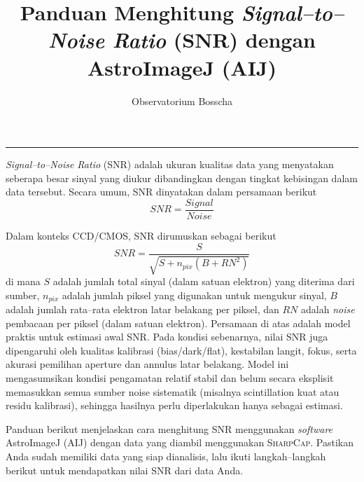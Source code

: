 \documentclass[12pt,a4paper]{article}
\title{\textbf{Panduan Menghitung \textit{Signal--to--Noise Ratio} (SNR)} dengan AstroImageJ (AIJ)}
\author{Observatorium Bosscha}
\begin{document}
\maketitle
\noindent\rule{\linewidth}{0.4pt}

\textit{Signal--to--Noise Ratio} (SNR) adalah ukuran kualitas data yang menyatakan seberapa besar sinyal yang diukur dibandingkan dengan tingkat kebisingan dalam data tersebut. Secara umum, SNR dinyatakan dalam persamaan berikut
\begin{equation}
	SNR = \frac{Signal}{Noise}
\end{equation}

Dalam konteks CCD/CMOS, SNR dirumuskan sebagai berikut
\begin{equation}
	SNR = \frac{S}{\sqrt{S + n_{pix} (B + RN^2)}}
\end{equation}
di mana $S$ adalah jumlah total sinyal (dalam satuan elektron) yang diterima dari sumber, $n_{pix}$ adalah jumlah piksel yang digunakan untuk mengukur sinyal, $B$ adalah jumlah rata--rata elektron latar belakang per piksel, dan $RN$ adalah \textit{noise} pembacaan per piksel (dalam satuan elektron).
Persamaan di atas adalah model praktis untuk estimasi awal SNR. Pada kondisi sebenarnya, nilai SNR juga dipengaruhi oleh kualitas kalibrasi (bias/dark/flat), kestabilan langit, fokus, serta akurasi pemilihan aperture dan annulus latar belakang.
Model ini mengasumsikan kondisi pengamatan relatif stabil dan belum secara eksplisit memasukkan semua sumber noise sistematik (misalnya scintillation kuat atau residu kalibrasi), sehingga hasilnya perlu diperlakukan hanya sebagai estimasi.

Panduan berikut menjelaskan cara menghitung SNR menggunakan \textit{software} AstroImageJ (AIJ) dengan data yang diambil menggunakan \textsc{SharpCap}. Pastikan Anda sudah memiliki data yang siap dianalisis, lalu ikuti langkah--langkah berikut untuk mendapatkan nilai SNR dari data Anda.
\end{document}

